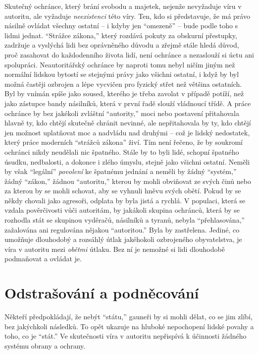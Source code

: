 \documentclass{book}
\begin{document}
Skutečný ochránce, který brání svobodu a majetek, nejenže nevyžaduje víru v autoritu, ale vyžaduje \emph{neexistenci} této víry. Ten, kdo si představuje, že má právo násilně ovládat všechny ostatní -- i kdyby jen \enquote{omezeně} -- bude podle toho s lidmi jednat. \enquote{Strážce zákona,} který rozdává pokuty za obskurní přestupky, zadržuje a vyslýchá lidi bez oprávněného důvodu a zřejmě stále hledá důvod, proč zasahovat do každodenního života lidí, není ochránce a nezaslouží si úctu ani spolupráci. Neautoritářský ochránce by naproti tomu nebyl ničím jiným než normální lidskou bytostí se stejnými právy jako všichni ostatní, i když by byl možná častěji ozbrojen a lépe vycvičen pro fyzický střet než většina ostatních. Byl by vnímán spíše jako soused, kterého je třeba zavolat v případě potíží, než jako zástupce bandy násilníků, která v první řadě slouží vládnoucí třídě. A práce ochránce by bez jakékoli zvláštní \enquote{autority,} moci nebo postavení přitahovala hlavně ty, kdo chtějí skutečně chránit nevinné, ale nepřitahovala by ty, kdo chtějí jen možnost uplatňovat moc a nadvládu nad druhými -- což je lidský nedostatek, který práce moderních \enquote{strážců zákona} živí. Tím není řečeno, že by soukromí ochránci nikdy neudělali nic špatného. Stále by to byli lidé, schopní špatného úsudku, nedbalosti, a dokonce i zlého úmyslu, stejně jako všichni ostatní. Neměli by však \enquote{legální} \emph{povolení} ke špatnému jednání a neměli by žádný \enquote{systém,} žádný \enquote{zákon,} žádnou \enquote{autoritu,} kterou by mohli obviňovat ze svých činů nebo za kterou by se mohli schovat, aby se vyhnuli hněvu svých obětí. Pokud by se někdy chovali jako agresoři, odplata by byla jistá a rychlá. V populaci, která se vzdala pověrčivosti vůči autoritám, by jakákoli skupina ochránců, která by se rozhodla stát se skupinou vyděračů, násilníků a tyranů, nebyla \enquote{přehlasována,} zažalována ani regulována nějakou \enquote{autoritou.} Byla by zastřelena. Jediné, co umožňuje dlouhodobý a rozsáhlý útlak jakéhokoli ozbrojeného obyvatelstva, je víra v autoritu mezi \emph{obětmi} útlaku. Bez ní je nemožné si lidi dlouhodobě podmaňovat a ovládat je.

\section{Odstrašování a podněcování}

Někteří předpokládají, že nebýt \enquote{státu,} gauneři by si mohli dělat, co se jim zlíbí, bez jakýchkoli následků. To opět ukazuje na hluboké nepochopení lidské povahy a toho, co je \enquote{stát.} Ve skutečnosti víra v autoritu nepřispívá k účinnosti žádného systému obrany a ochrany.
\end{document}
